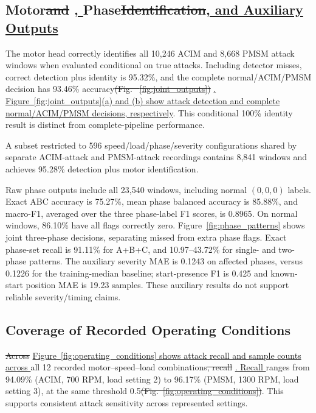 \documentclass[conference,letterpaper]{IEEEtran}
\providecommand{\DIFadd}[1]{{\protect\color{blue}\uline{#1}}} %
\providecommand{\DIFdel}[1]{{\protect\color{red}\sout{#1}}}                      %
\providecommand{\DIFaddbegin}{} %
\providecommand{\DIFaddend}{} %
\providecommand{\DIFdelbegin}{} %
\providecommand{\DIFdelend}{} %
\begin{document}
\subsection{Motor\DIFdelbegin \DIFdel{and }\DIFdelend \DIFaddbegin \DIFadd{, }\DIFaddend Phase\DIFdelbegin \DIFdel{Identification}\DIFdelend \DIFaddbegin \DIFadd{, and Auxiliary Outputs}\DIFaddend }
The motor head correctly identifies all 10,246 ACIM and 8,668 PMSM attack windows when evaluated conditional on true attacks. Including detector misses, correct detection plus identity is 95.32\%, and the complete normal/ACIM/PMSM decision has 93.46\% accuracy\DIFdelbegin \DIFdel{(Fig. ~\ref{fig:joint_outputs}) }\DIFdelend \DIFaddbegin \DIFadd{. Figure~\ref{fig:joint_outputs}(a) and (b) show attack detection and complete normal/ACIM/PMSM decisions, respectively}\DIFaddend . This conditional 100\% identity result is distinct from complete-pipeline performance.

A subset restricted to 596 speed/load/phase/severity configurations shared by separate ACIM-attack and PMSM-attack recordings contains 8,841 windows and achieves 95.28\% detection plus motor identification.

Raw phase outputs include all 23,540 windows, including normal $(0,0,0)$ labels. Exact ABC accuracy is 75.27\%, mean phase balanced accuracy is 85.88\%, and macro-F1, averaged over the three phase-label F1 scores, is 0.8965. On normal windows, 86.10\% have all flags correctly zero. Figure~\ref{fig:phase_patterns} shows joint three-phase decisions, separating missed from extra phase flags. Exact phase-set recall is 91.11\% for A+B+C, and 10.97--43.72\% for single- and two-phase patterns. The auxiliary severity MAE is 0.1243 on affected phases, versus 0.1226 for the training-median baseline; start-presence F1 is 0.425 and known-start position MAE is 19.23 samples. These auxiliary results do not support reliable severity/timing claims.







\subsection{Coverage of Recorded Operating Conditions}


\DIFdelbegin \DIFdel{Across }\DIFdelend \DIFaddbegin \DIFadd{Figure~\ref{fig:operating_conditions} shows attack recall and sample counts across }\DIFaddend all 12 recorded motor--speed--load combinations\DIFdelbegin \DIFdel{, recall }\DIFdelend \DIFaddbegin \DIFadd{. Recall }\DIFaddend ranges from 94.09\% (ACIM, 700 RPM, load setting 2) to 96.17\% (PMSM, 1300 RPM, load setting 3), at the same threshold 0.5\DIFdelbegin \DIFdel{(Fig.~\ref{fig:operating_conditions})}\DIFdelend . This supports consistent attack sensitivity across represented settings.
\DIFaddbegin
\end{document}
